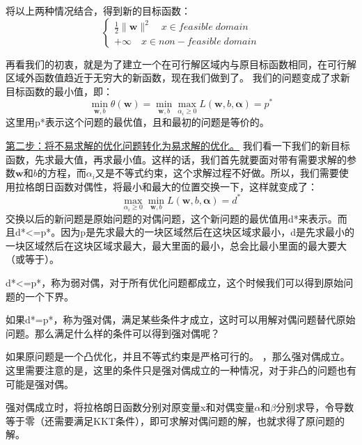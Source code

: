 \documentclass[UTF8]{ctexart} %
\begin{document}
\begin{multicols}{2}
					将以上两种情况结合，得到新的目标函数：
					\[\begin{cases}
						\frac{1}{2}\|\bm{w}\|^2\quad x\in feasible\; domain\\
						+\infty \quad x\in non-feasible\; domain
					\end{cases}\]
					
					再看我们的初衷，就是为了建立一个在可行解区域内与原目标函数相同，在可行解区域外函数值趋近于无穷大的新函数，现在我们做到了。 我们的问题变成了求新目标函数的最小值，即：
					\[\min_{\bm{w},b}\theta(\bm{w}) = \min_{\bm{w},b}\max_{\alpha_i\geq0}L(\bm{w},b,\bm{\alpha})=p^*\]
					这里用p*表示这个问题的最优值，且和最初的问题是等价的。
					
					\uline{第二步：将不易求解的优化问题转化为易求解的优化。}
					我们看一下我们的新目标函数，先求最大值，再求最小值。这样的话，我们首先就要面对带有需要求解的参数$\bm{w}$和$b$的方程，而$\alpha_i$又是不等式约束，这个求解过程不好做。所以，我们需要使用拉格朗日函数对偶性，将最小和最大的位置交换一下，这样就变成了：
					\[\max_{\alpha_i\geq0}\min_{\bm{w},b}L(\bm{w},b,\bm{\alpha})=d^*\]
					交换以后的新问题是原始问题的对偶问题，这个新问题的最优值用d*来表示。而且d*<=p*。因为p是先求最大的一块区域然后在这块区域求最小，d是先求最小的一块区域然后在这块区域求最大，最大里面的最小，总会比最小里面的最大要大（或等于）。
								
					d*<=p*，称为弱对偶，对于所有优化问题都成立，这个时候我们可以得到原始问题的一个下界。
					
					如果d*=p*，称为强对偶，满足某些条件才成立，这时可以用解对偶问题替代原始问题。那么满足什么样的条件可以得到强对偶呢？
					
					如果原问题是一个凸优化，并且不等式约束是严格可行的。					
					，那么强对偶成立。这里需要注意的是，这里的条件只是强对偶成立的一种情况，对于非凸的问题也有可能是强对偶。
					
					强对偶成立时，将拉格朗日函数分别对原变量x和对偶变量$\alpha$和$\beta$分别求导，令导数等于零（还需要满足KKT条件），即可求解对偶问题的解，也就求得了原问题的解。
					
					
					
		\end{multicols}
		
	
	
		
\end{document}
